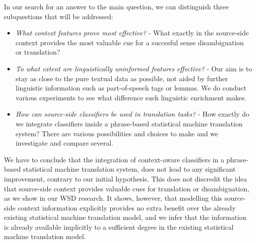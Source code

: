 In our search for an answer to the main question, we can distinguish three subquestions that will be addressed:

\begin{itemize}
\item \emph{What context features prove most effective?} - What exactly in the source-side context provides the most
    valuable cue for a succesful sense disambiguation or translation?
\item \emph{To what extent are linguistically uninformed features effective?} -  Our aim is to stay as close to the pure
    textual data as possible, not aided by further linguistic information such as part-of-speech tags or lemmas. We do
    conduct various experiments to see what difference such linguistic enrichment makes.
\item \emph{How can source-side classifiers be used in translation tasks?} - How exactly do we integrate classifiers inside a phrase-based statistical machine translation system? There are various possibilities and choices to make and we investigate and compare several.
\end{itemize}

We have to conclude that the integration of context-aware classifiers in a
phrase-based statistical machine translation system, does not lead to any
significant improvement, contrary to our initial hypothesis. This does not
discredit the idea that source-side context provides valuable cues for
translation or disambiguation, as we show in our WSD research.  It shows, however,
that modelling this source-side context information explicitly provides no
extra benefit over the already existing statistical machine translation model, and we infer
that the information is already available implicitly to a sufficient degree in the
existing statistical machine translation model.

